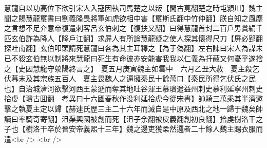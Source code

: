 慧龍自以功高位下欲引宋人入寇因執司馬楚之以叛【間古莧翻楚之時屯潁川】魏主聞之賜慧龍璽書曰劉義隆畏將軍如虎欲相中害【璽斯氏翻中竹仲翻】朕自知之風塵之言想不足介意帝復遣刺客呂玄伯刺之【復扶又翻】曰得慧龍首封二百戶男賞絹千匹玄伯詐為降人【降戶江翻】求屏人有所論慧龍疑之使人探其懷得尺刀【屏必郢翻探吐南翻】玄伯叩頭請死慧龍曰各為其主耳釋之【為于偽翻】左右諫曰宋人為謀未已不殺玄伯無以制將來慧龍曰死生有命彼亦安能害我我以仁義為扞蔽又何憂乎遂捨之【史因慧龍守滎陽終言之】　夏五月庚寅魏主如雲中　六月乙丑大赦　夏主殺乞伏暮末及其宗族五百人　夏主畏魏人之逼擁秦民十餘萬口【秦民所得乞伏氏之民也】自治城濟河欲擊河西王蒙遜而奪其地吐谷渾王慕璝遣益州刺史慕利延寧州刺史拾虔【璝古囬翻　考異曰十六國春秋作没利延拾虎今從宋書】帥騎三萬乘其半濟邀擊之執夏主定以歸【赫連氏歷三主二十六年而滅自是中原及西北之地一歸于魏矣帥讀曰率騎奇寄翻】沮渠興國被創而死【沮子余翻被皮義翻創初良翻】拾虔樹洛干之子也【樹洛干卒於晉安帝義熙十三年】魏之邊吏獲柔然邏者二十餘人魏主賜衣服而遣<br />
<br />
